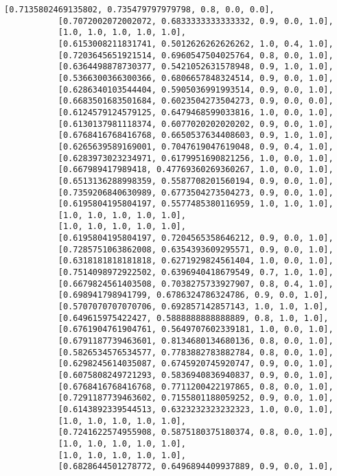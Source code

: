 \documentclass[11pt]{article}
\begin{document}
\begin{Verbatim}[commandchars=\\\{\}]
           [0.7135802469135802, 0.735479797979798, 0.8, 0.0, 0.0],
           [0.7072002072002072, 0.6833333333333332, 0.9, 0.0, 1.0],
           [1.0, 1.0, 1.0, 1.0, 1.0],
           [0.6153008211831741, 0.5012626262626262, 1.0, 0.4, 1.0],
           [0.7203645651921514, 0.6960547504025764, 0.8, 0.0, 1.0],
           [0.6364498878730377, 0.5421052631578948, 0.9, 1.0, 1.0],
           [0.5366300366300366, 0.6806657848324514, 0.9, 0.0, 1.0],
           [0.6286340103544404, 0.5905036991993514, 0.9, 0.0, 1.0],
           [0.6683501683501684, 0.6023504273504273, 0.9, 0.0, 0.0],
           [0.6124579124579125, 0.6479468599033816, 1.0, 0.0, 1.0],
           [0.6130137981118374, 0.6077020202020202, 0.9, 0.0, 1.0],
           [0.6768416768416768, 0.6650537634408603, 0.9, 1.0, 1.0],
           [0.6265639589169001, 0.7047619047619048, 0.9, 0.4, 1.0],
           [0.6283973023234971, 0.6179951690821256, 1.0, 0.0, 1.0],
           [0.667989417989418, 0.47769360269360267, 1.0, 0.0, 1.0],
           [0.6513136288998359, 0.5587708201560194, 0.9, 0.0, 1.0],
           [0.7359206840630989, 0.6773504273504273, 0.9, 0.0, 1.0],
           [0.6195804195804197, 0.5577485380116959, 1.0, 1.0, 1.0],
           [1.0, 1.0, 1.0, 1.0, 1.0],
           [1.0, 1.0, 1.0, 1.0, 1.0],
           [0.6195804195804197, 0.7204565358646212, 0.9, 0.0, 1.0],
           [0.7285751063862008, 0.6354393609295571, 0.9, 0.0, 1.0],
           [0.6318181818181818, 0.6271929824561404, 1.0, 0.0, 1.0],
           [0.7514098972922502, 0.6396940418679549, 0.7, 1.0, 1.0],
           [0.6679824561403508, 0.7038275733927907, 0.8, 0.4, 1.0],
           [0.698941798941799, 0.6786324786324786, 0.9, 0.0, 1.0],
           [0.5707070707070706, 0.692857142857143, 1.0, 1.0, 1.0],
           [0.649615975422427, 0.5888888888888889, 0.8, 1.0, 1.0],
           [0.6761904761904761, 0.5649707602339181, 1.0, 0.0, 1.0],
           [0.6791187739463601, 0.8134680134680136, 0.8, 0.0, 1.0],
           [0.5826534576534577, 0.7783882783882784, 0.8, 0.0, 1.0],
           [0.6298245614035087, 0.6745920745920747, 0.9, 0.0, 1.0],
           [0.6075808249721293, 0.5836940836940837, 0.9, 0.0, 1.0],
           [0.6768416768416768, 0.7711200422197865, 0.8, 0.0, 1.0],
           [0.7291187739463602, 0.7155801188059252, 0.9, 0.0, 1.0],
           [0.6143892339544513, 0.6323232323232323, 1.0, 0.0, 1.0],
           [1.0, 1.0, 1.0, 1.0, 1.0],
           [0.7241622574955908, 0.5875180375180374, 0.8, 0.0, 1.0],
           [1.0, 1.0, 1.0, 1.0, 1.0],
           [1.0, 1.0, 1.0, 1.0, 1.0],
           [0.6828644501278772, 0.6496894409937889, 0.9, 0.0, 1.0],

\end{Verbatim}
\end{document}
